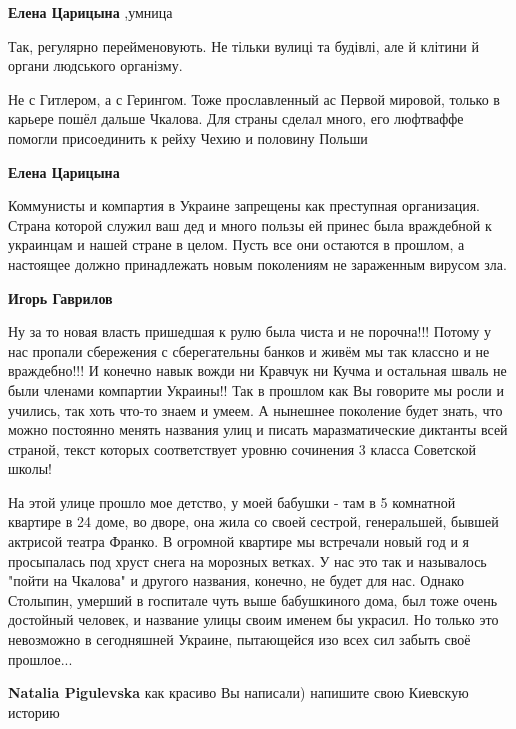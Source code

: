 \begin{itemize}
\begin{itemize}
\textbf{Елена Царицына} ,умница

Так, регулярно перейменовують. Не тільки вулиці та будівлі, але й клітини й органи людського організму.


Не с Гитлером, а с Герингом. Тоже прославленный ас Первой мировой, только в
карьере пошёл дальше Чкалова. Для страны сделал много, его люфтваффе помогли
присоединить к рейху Чехию и половину Польши

\textbf{Елена Царицына} 

Коммунисты и компартия в Украине запрещены как преступная организация. Страна
которой служил ваш дед и много пользы ей принес была враждебной к украинцам и
нашей стране в целом. Пусть все они остаются в прошлом, а настоящее должно
принадлежать новым поколениям не зараженным вирусом зла.

\begin{itemize} %
\textbf{Игорь Гаврилов} 

Ну за то новая власть пришедшая к рулю была чиста и не порочна!!! Потому у нас
пропали сбережения с сберегательны банков и живём мы так классно и не
враждебно!!! И конечно навык вожди ни Кравчук ни Кучма и остальная шваль не
были членами компартии Украины!! Так в прошлом как Вы говорите мы росли и
учились, так хоть что-то знаем и умеем. А нынешнее поколение будет знать, что
можно постоянно менять названия улиц и писать маразматические диктанты всей
страной, текст которых соответствует уровню сочинения 3 класса Советской школы!

\end{itemize} %

\end{itemize} %


На этой улице прошло мое детство, у моей бабушки - там в 5 комнатной квартире в
24 доме, во дворе, она жила со своей сестрой, генеральшей, бывшей актрисой
театра Франко. В огромной квартире мы встречали новый год и я просыпалась под
хруст снега на морозных ветках. У нас это так и называлось "пойти на Чкалова" и
другого названия, конечно, не будет для нас. Однако Столыпин, умерший в
госпитале чуть выше бабушкиного дома, был тоже очень достойный человек, и
название улицы своим именем бы украсил. Но только это невозможно в сегодняшней
Украине, пытающейся изо всех сил забыть своё прошлое...

\begin{itemize} %
\textbf{Natalia Pigulevska} как красиво Вы написали) напишите свою Киевскую историю


\end{itemize}
\end{itemize}
